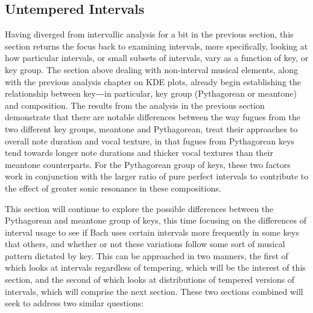     \subsection{Untempered Intervals}\label{untempered-intervals}

Having diverged from intervallic analysis for a bit in the previous
section, this section returns the focus back to examining intervals,
more specifically, looking at how particular intervals, or small subsets
of intervals, vary as a function of key, or key group. The section above
dealing with non-interval musical elements, along with the previous
analysis chapter on KDE plots, already begin establishing the
relationship between key-\/-\/-in particular, key group (Pythagorean or
meantone) and composition. The results from the analysis in the previous
section demonstrate that there are notable differences between the way
fugues from the two different key groups, meantone and Pythagorean,
treat their approaches to overall note duration and vocal texture, in
that fugues from Pythagorean keys tend towards longer note durations and
thicker vocal textures than their meantone counterparts. For the
Pythagorean group of keys, these two factors work in conjunction with
the larger ratio of pure perfect intervals to contribute to the effect
of greater sonic resonance in these compositions.

This section will continue to explore the possible differences between
the Pythagorean and meantone group of keys, this time focusing on the
differences of interval usage to see if Bach uses certain intervals more
frequently in some keys that others, and whether or not these variations
follow some sort of musical pattern dictated by key. This can be
approached in two manners, the first of which looks at intervals
regardless of tempering, which will be the interest of this section, and
the second of which looks at distributions of tempered versions of
intervals, which will comprise the next section. These two sections
combined will seek to address two similar questions:

